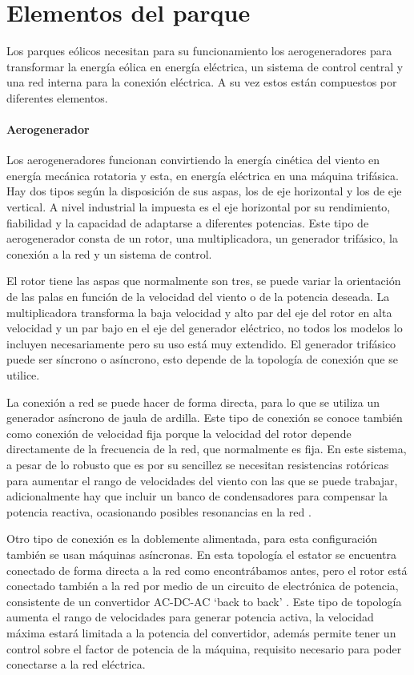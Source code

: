 \documentclass{book}
\begin{document}
	\section{Elementos del parque}
Los parques e\'olicos necesitan para su funcionamiento los aerogeneradores para transformar la energ\'ia e\'olica en energ\'ia el\'ectrica, un sistema de control central y una red interna para la conexi\'on el\'ectrica. A su vez estos est\'an compuestos por diferentes elementos.

		\paragraph{Aerogenerador}
		Los aerogeneradores funcionan convirtiendo la energ\'ia cin\'etica del viento en energ\'ia mec\'anica rotatoria y esta, en energ\'ia el\'ectrica en una m\'aquina trif\'asica. Hay dos tipos seg\'un la disposici\'on de sus aspas, los de eje horizontal y los de eje vertical. A nivel industrial la impuesta es el eje horizontal por su rendimiento, fiabilidad y la capacidad de adaptarse a diferentes potencias. Este tipo de aerogenerador consta de un rotor, una multiplicadora, un generador trif\'asico, la conexi\'on a la red y un sistema de control. \par
		El rotor tiene las aspas que normalmente son tres, se puede variar la orientaci\'on de las palas en funci\'on de la velocidad del viento o de la potencia deseada. La multiplicadora transforma la baja velocidad y alto par del eje del rotor en alta velocidad y un par bajo en el eje del generador el\'ectrico, no todos los modelos lo incluyen necesariamente pero su uso est\'a muy extendido. El generador trif\'asico puede ser s\'incrono  o as\'incrono, esto depende de la topolog\'ia de conexi\'on que se utilice.  \par
		La conexi\'on a red se puede hacer de forma directa, para lo que se utiliza un generador as\'incrono de jaula de ardilla. Este tipo de conexi\'on se conoce tambi\'en como conexi\'on de velocidad fija porque la velocidad del rotor depende directamente de la frecuencia de la red, que normalmente es fija. En este sistema, a pesar de lo robusto que es por su sencillez se necesitan resistencias rot\'oricas para aumentar el rango de velocidades del viento con las que se puede trabajar, adicionalmente hay que incluir un banco de condensadores para compensar la potencia reactiva, ocasionando posibles resonancias en la red \cite{TopologiasWT}. \par 
		Otro tipo de conexi\'on es la doblemente alimentada, para esta configuraci\'on tambi\'en se usan m\'aquinas as\'incronas. En esta topolog\'ia el estator se encuentra conectado de forma directa a  la red como encontr\'abamos antes, pero el rotor est\'a conectado tambi\'en a la red por medio de un circuito de electr\'onica de potencia, consistente de un convertidor AC-DC-AC ‘back to back’ \cite{AerogeneradorDIFG}. Este tipo de topolog\'ia aumenta el rango de velocidades para generar potencia activa, la velocidad m\'axima estar\'a limitada a la potencia del convertidor, adem\'as permite tener un control sobre el factor de potencia de la m\'aquina, requisito necesario para poder conectarse a la red el\'ectrica. \par
\end{document}
